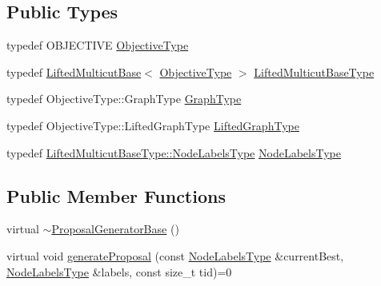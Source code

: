 \subsection*{Public Types}
\begin{DoxyCompactItemize}
\item 
typedef O\+B\+J\+E\+C\+T\+I\+V\+E \hyperlink{classnifty_1_1graph_1_1optimization_1_1lifted__multicut_1_1ProposalGeneratorBase_a40e3d86c1e137e6745eaf17a3a500af0}{Objective\+Type}
\item 
typedef \hyperlink{classnifty_1_1graph_1_1optimization_1_1lifted__multicut_1_1LiftedMulticutBase}{Lifted\+Multicut\+Base}$<$ \hyperlink{classnifty_1_1graph_1_1optimization_1_1lifted__multicut_1_1ProposalGeneratorBase_a40e3d86c1e137e6745eaf17a3a500af0}{Objective\+Type} $>$ \hyperlink{classnifty_1_1graph_1_1optimization_1_1lifted__multicut_1_1ProposalGeneratorBase_ac5b8a94509d7163a19e839f33f75a73e}{Lifted\+Multicut\+Base\+Type}
\item 
typedef Objective\+Type\+::\+Graph\+Type \hyperlink{classnifty_1_1graph_1_1optimization_1_1lifted__multicut_1_1ProposalGeneratorBase_ac9239a181009fa1b2de8b81f98b7aa38}{Graph\+Type}
\item 
typedef Objective\+Type\+::\+Lifted\+Graph\+Type \hyperlink{classnifty_1_1graph_1_1optimization_1_1lifted__multicut_1_1ProposalGeneratorBase_a9f778a5f14d9b1a06e90722b01f04b50}{Lifted\+Graph\+Type}
\item 
typedef \hyperlink{classnifty_1_1graph_1_1optimization_1_1common_1_1SolverBase_a6e4e465f3b6e039882669fcfb9714818}{Lifted\+Multicut\+Base\+Type\+::\+Node\+Labels\+Type} \hyperlink{classnifty_1_1graph_1_1optimization_1_1lifted__multicut_1_1ProposalGeneratorBase_a908a9320edb8af8735bc68481224b75e}{Node\+Labels\+Type}
\end{DoxyCompactItemize}
\subsection*{Public Member Functions}
\begin{DoxyCompactItemize}
\item 
virtual \hyperlink{classnifty_1_1graph_1_1optimization_1_1lifted__multicut_1_1ProposalGeneratorBase_a0e46c2c505a04f0d62fbc8a6b2fb5eb0}{$\sim$\+Proposal\+Generator\+Base} ()
\item 
virtual void \hyperlink{classnifty_1_1graph_1_1optimization_1_1lifted__multicut_1_1ProposalGeneratorBase_af3134cfd7988a1758c4a714e8a5300b1}{generate\+Proposal} (const \hyperlink{classnifty_1_1graph_1_1optimization_1_1lifted__multicut_1_1ProposalGeneratorBase_a908a9320edb8af8735bc68481224b75e}{Node\+Labels\+Type} \&current\+Best, \hyperlink{classnifty_1_1graph_1_1optimization_1_1lifted__multicut_1_1ProposalGeneratorBase_a908a9320edb8af8735bc68481224b75e}{Node\+Labels\+Type} \&labels, const size\+\_\+t tid)=0
\end{DoxyCompactItemize}


